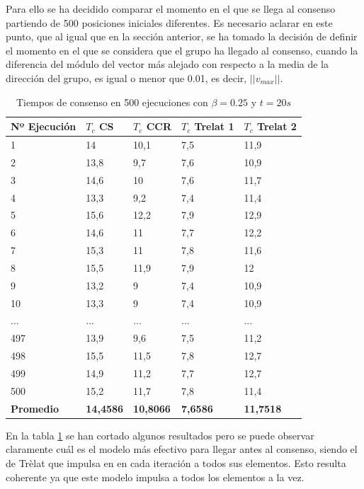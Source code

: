 Para ello se ha decidido comparar el momento en el que se llega al consenso partiendo de 500 posiciones iniciales diferentes. Es necesario aclarar en este punto, que al igual que en la sección anterior, se ha tomado la decisión de definir el momento en el que se considera que el grupo ha llegado al consenso, cuando la diferencia del módulo del vector más alejado con respecto a la media de la dirección del grupo, es igual o menor que 0.01, es decir, $||v_{max}||$.

\begin{table}[!ht]
    \centering
    \begin{tabular}{|l|l|l|l|l|}
    \hline
        \textbf{Nº Ejecución} & \textbf{$T_c$ CS} & \textbf{$T_c$ CCR} & \textbf{$T_c$ Trelat 1} & \textbf{$T_c$ Trelat 2} \\ \hline
        1 & 14 & 10,1 & 7,5 & 11,9 \\ \hline
        2 & 13,8 & 9,7 & 7,6 & 10,9 \\ \hline
        3 & 14,6 & 10 & 7,6 & 11,7 \\ \hline
        4 & 13,3 & 9,2 & 7,4 & 11,4 \\ \hline
        5 & 15,6 & 12,2 & 7,9 & 12,9 \\ \hline
        6 & 14,6 & 11 & 7,7 & 12,2 \\ \hline
        7 & 15,3 & 11 & 7,8 & 11,6 \\ \hline
        8 & 15,5 & 11,9 & 7,9 & 12 \\ \hline
        9 & 13,2 & 9 & 7,4 & 10,9 \\ \hline
        10 & 13,3 & 9 & 7,4 & 10,9 \\ \hline \hline
        ... & ... & ... & ... & ...\\ \hline \hline
        497 & 13,9 & 9,6 & 7,5 & 11,2 \\ \hline
        498 & 15,5 & 11,5 & 7,8 & 12,7 \\ \hline
        499 & 14,9 & 11,2 & 7,7 & 12,7 \\ \hline
        500 & 15,2 & 11,7 & 7,8 & 11,4 \\ \hline \hline
        \textbf{Promedio} & \textbf{14,4586} & \textbf{10,8066} & \textbf{7,6586} & \textbf{11,7518} \\ \hline
    \end{tabular}
    \caption{Tiempos de consenso en 500 ejecuciones con $\beta=0.25$ y $t=20s$}
    \label{tab:tiemposConsenso}
\end{table}

En la tabla \ref{tab:tiemposConsenso} se han cortado algunos resultados pero se puede observar claramente cuál es el modelo más efectivo para llegar antes al consenso, siendo el de Trèlat que impulsa en en cada iteración a todos sus elementos. Esto resulta coherente ya que este modelo impulsa a todos los elementos a la vez.

